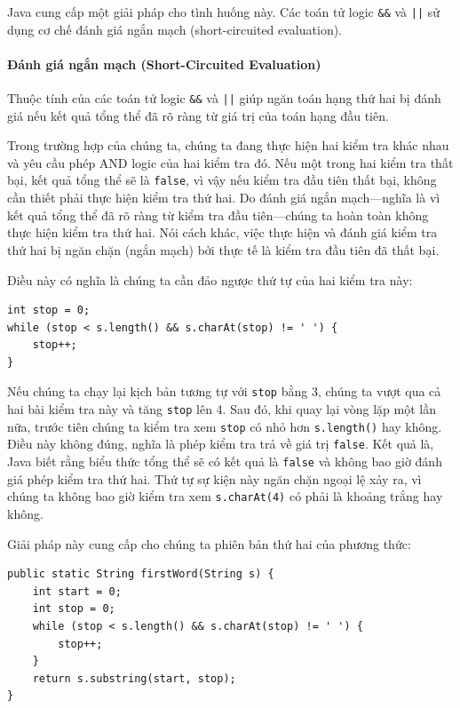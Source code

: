 Java cung cấp một giải pháp cho tình huống này. Các toán tử logic \texttt{\&\&} và \texttt{||} sử dụng cơ chế đánh giá ngắn mạch (short-circuited evaluation).

\paragraph{Đánh giá ngắn mạch (Short-Circuited Evaluation)}
Thuộc tính của các toán tử logic \texttt{\&\&} và \texttt{||} giúp ngăn toán hạng thứ hai bị đánh giá nếu kết quả tổng thể đã rõ ràng từ giá trị của toán hạng đầu tiên.

Trong trường hợp của chúng ta, chúng ta đang thực hiện hai kiểm tra khác nhau và yêu cầu phép AND logic của hai kiểm tra đó. Nếu một trong hai kiểm tra thất bại, kết quả tổng thể sẽ là \texttt{false}, vì vậy nếu kiểm tra đầu tiên thất bại, không cần thiết phải thực hiện kiểm tra thứ hai. Do đánh giá ngắn mạch—nghĩa là vì kết quả tổng thể đã rõ ràng từ kiểm tra đầu tiên—chúng ta hoàn toàn không thực hiện kiểm tra thứ hai. Nói cách khác, việc thực hiện và đánh giá kiểm tra thứ hai bị ngăn chặn (ngắn mạch) bởi thực tế là kiểm tra đầu tiên đã thất bại.

Điều này có nghĩa là chúng ta cần đảo ngược thứ tự của hai kiểm tra này:

\begin{verbatim}
int stop = 0;
while (stop < s.length() && s.charAt(stop) != ' ') {
    stop++;
}
\end{verbatim}

Nếu chúng ta chạy lại kịch bản tương tự với \texttt{stop} bằng 3, chúng ta vượt qua cả hai bài kiểm tra này và tăng \texttt{stop} lên 4. Sau đó, khi quay lại vòng lặp một lần nữa, trước tiên chúng ta kiểm tra xem \texttt{stop} có nhỏ hơn \texttt{s.length()} hay không. Điều này không đúng, nghĩa là phép kiểm tra trả về giá trị \texttt{false}. Kết quả là, Java biết rằng biểu thức tổng thể sẽ có kết quả là \texttt{false} và không bao giờ đánh giá phép kiểm tra thứ hai. Thứ tự sự kiện này ngăn chặn ngoại lệ xảy ra, vì chúng ta không bao giờ kiểm tra xem \texttt{s.charAt(4)} có phải là khoảng trắng hay không.

Giải pháp này cung cấp cho chúng ta phiên bản thứ hai của phương thức:

\begin{verbatim}
public static String firstWord(String s) {
    int start = 0;
    int stop = 0;
    while (stop < s.length() && s.charAt(stop) != ' ') {
        stop++;
    }
    return s.substring(start, stop);
}
\end{verbatim}


